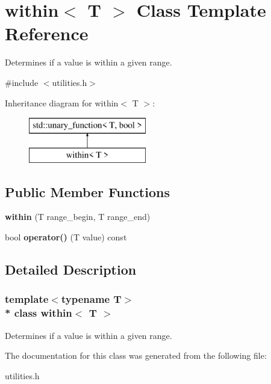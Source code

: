 \section{within$<$ T $>$ Class Template Reference}
\label{classwithin}


Determines if a value is within a given range.  




{\ttfamily \#include $<$utilities.\+h$>$}

Inheritance diagram for within$<$ T $>$\+:\begin{figure}[H]
\begin{center}
\leavevmode
\includegraphics[height=2.000000cm]{classwithin}
\end{center}
\end{figure}
\subsection*{Public Member Functions}
\begin{DoxyCompactItemize}
\item 
{\bf within} (T range\+\_\+begin, T range\+\_\+end)
\item 
bool {\bf operator()} (T value) const 
\end{DoxyCompactItemize}


\subsection{Detailed Description}
\subsubsection*{template$<$typename T$>$\\*
class within$<$ T $>$}

Determines if a value is within a given range. 

The documentation for this class was generated from the following file\+:\begin{DoxyCompactItemize}
\item 
utilities.\+h\end{DoxyCompactItemize}
